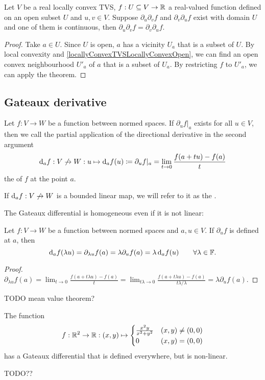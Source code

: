 \begin{corollary}
Let $V$ be a real locally convex TVS, $f:U\subseteq V\to \mathbb{R}$ a real-valued function defined on an open subset $U$ and $u,v\in V$. Suppose $\partial_u\partial_v f$ and $\partial_v\partial_u f$ exist with domain $U$ and one of them is continuous, then $\partial_u\partial_v f = \partial_v\partial_u f$.
\end{corollary}
\begin{proof}
Take $a\in U$. Since $U$ is open, $a$ has a vicinity $U_a$ that is a subset of $U$. By local convexity and \ref{locallyConvexTVSLocallyConvexOpen}, we can find an open convex neighbourhood $U'_a$ of $a$ that is a subset of $U_a$. By restricting $f$ to $U'_a$, we can apply the theorem.
\end{proof}




\subsection{Gateaux derivative}
\begin{definition}
Let $f:V\to W$ be a function between normed spaces. If $\partial_u f|_a$ exists for all $u\in V$, then we call the partial application of the directional derivative in the second argument
\[ \operatorname{d \!}{_af}: V\not\to W: u\mapsto \operatorname{d \!}{_af}(u) \coloneqq \partial_u f|_a = \lim_{t\to 0} \frac{f(a+tu) - f(a)}{t} \]
the  of $f$ at the point $a$.

If $\operatorname{d \!}{_af}: V\not\to W$ is a bounded linear map, we will refer to it as the .
\end{definition}
The Gateaux differential is homogeneous even if it is not linear:
\begin{lemma}
Let $f:V\to W$ be a function between normed spaces and $a,u\in V$. If $\partial_u f$ is defined at $a$, then
\[ \operatorname{d \!}{_a f}(\lambda u) = \partial_{\lambda u}f(a) = \lambda\partial_u f(a) = \lambda \operatorname{d \!}{_a f}(u) \qquad \forall \lambda\in\mathbb{F}. \]
\end{lemma}
\begin{proof}
$\partial_{\lambda u}f(a) = \lim_{t\to 0} \frac{f(a+t\lambda u) - f(a)}{t} = \lim_{t\lambda\to 0} \frac{f(a+t\lambda u) - f(a)}{t \lambda / \lambda} = \lambda\partial_u f(a)$.
\end{proof}

TODO mean value theorem?

\begin{example}
The function
\[ f: \mathbb{R}^2\to \mathbb{R}: (x,y) \mapsto \begin{cases}
\frac{x^2y}{x^2+y^2} & (x,y)\neq (0,0) \\0 & (x,y) = (0,0)
\end{cases} \]
has a Gateaux differential that is defined everywhere, but is non-linear.

TODO??
\end{example}

